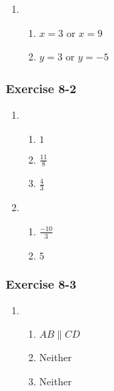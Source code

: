 {\begin{multicols}{3}
\begin{enumerate}[label=\textbf{\arabic*}.]
\item %
 \begin{enumerate}[noitemsep, label=\textbf{(\alph*)} ] 
\item $x = 3$ or $x = 9$%
\item $y=3$ or $y=-5$%
\end{enumerate}
\end{enumerate}

\subsubsection*{Exercise 8-2} %
\begin{enumerate}[noitemsep, label=\textbf{\arabic*}. ]
\item %
 \begin{enumerate}[itemsep=1pt, label=\textbf{(\alph*)} ] 
\item $1$%
\item $\frac{11}{8}$%
\item $\frac{4}{3}$%
\end{enumerate}

\item %
\begin{enumerate}[itemsep=1pt, label=\textbf{(\alph*)} ] 
\item $\frac{-10}{3}$%
\item $5$%
\end{enumerate}
\end{enumerate}


\subsubsection*{Exercise 8-3} %
  \begin{enumerate}[noitemsep, label=\textbf{\arabic*}. ]

\item %
\begin{enumerate}[noitemsep, label=\textbf{(\alph*)} ]
\item $AB \parallel CD$%
\item Neither%
\item Neither%
\end{enumerate}


\end{enumerate}
\end{multicols}}
